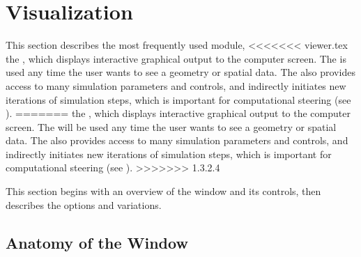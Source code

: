   \newcommand{\boxwidget}%
  {\centerline{\epsfig{file=Figures/widget-box.eps.gz,height=2in,
  bbllx=0, bblly=0, bburx=458, bbury=342}}}
\begin{htmlonly}
  \newcommand{\boxwidget}{%
  \htmladdimg[align=top,width=459,alt="boxwidget"]
  {../Figures/widget-box.gif}}
\end{htmlonly}

  \newcommand{\ringwidget}%
  {\centerline{\epsfig{file=Figures/widget-ring.eps.gz,height=2in,
  bbllx=0, bblly=0, bburx=507, bbury=467}}}
\begin{htmlonly}
  \newcommand{\ringwidget}{%
  \htmladdimg[align=top,width=508,alt="ringwidget"]
  {../Figures/widget-ring.gif}}
\end{htmlonly}

\newcommand{\graphics}{\emph{Graphics}}

\section{Visualization}
\label{sec:viewer}

This section describes the most frequently used \sr{} module,
<<<<<<< viewer.tex
the \viewer{}, which displays interactive graphical
output to the computer screen.  The \viewer{} is used any time the user
wants to see a geometry or spatial data. The \viewer{} also provides access to
many simulation parameters and controls, and indirectly initiates new
iterations of  simulation steps, which is important for computational steering (see ).
=======
the \viewer{}, which displays interactive graphical
output to the computer screen.  The \viewer{} will be used any time the user
wants to see a geometry or spatial data. The \viewer{} also provides access to
many simulation parameters and controls, and indirectly initiates new
iterations of  simulation steps, which is important for computational steering (see ).
>>>>>>> 1.3.2.4

This section begins with an overview of the \viewer{} window and its
controls, then describes the options and variations.

\subsection{Anatomy of the \viewer{} Window}
\label{sec:viewer-anatomy} 


